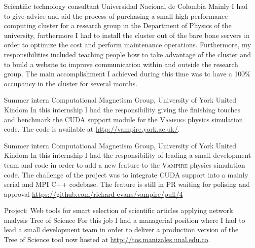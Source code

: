 \documentclass[12pt,english]{moderncv}
\begin{document}
        {Scientific technology consultant}
        {Universidad Nacional de Colombia}
        {}
        {}
        {%
            Mainly I had to give advice and aid the process of purchasing a
            small high performance computing cluster for a research group in
            the Department of Physics of the university, furthermore I had to
            install the cluster out of the bare bone servers in order to
            optimize the cost and perform maintenance operations. Furthermore,
            my responsibilities included teaching people how to take advantage
            of the cluster and to build a website to improve communication
            within and outside the research group. The main accomplishment I
            achieved during this time was to have a 100\% occupancy in the
            cluster for several months.
        }

        {Summer intern}
        {Computational Magnetism Group, University of York}
        {United Kindom}
        {}
        {%
            In this internship I had the responsibility giving the finishing
            touches and benchmark the CUDA support module for the
            \textsc{Vampire} physics simulation code. The code is available
            at \url{http://vampire.york.ac.uk/}.
        }

        {Summer intern}
        {Computational Magnetism Group, University of York}
        {United Kindom}
        {}
        {%
            In this internship I had the responsibility of leading a small
            development team and code in order to add a new feature to the
            \textsc{Vampire} physics simulation code. The challenge of the
            project was to integrate CUDA support into a mainly serial and MPI
            C++ codebase. The feature is still in PR waiting for polising and
            approval \url{https://github.com/richard-evans/vampire/pull/4}
        }

        {Project: Web tools for smart selection of scientific articles applying network analysis}
        {Tree of Science}
        {}
        {}
        {%
            For this job I had a managerial position where I had to lead a
            small development team in order to deliver a production version of
            the Tree of Science tool now hosted at
            \url{http://tos.manizales.unal.edu.co}.
        }
\end{document}
